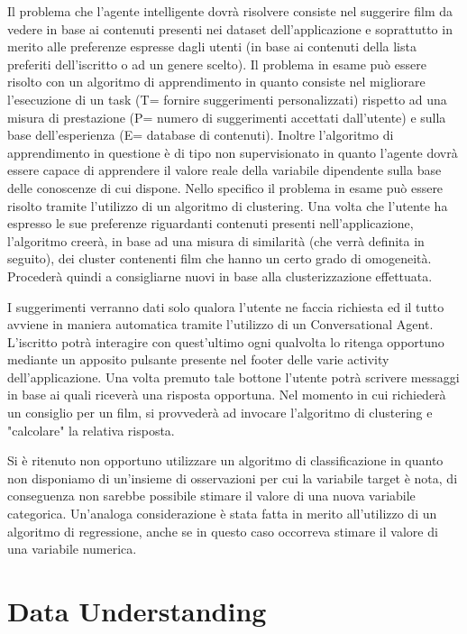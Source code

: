 \documentclass[a4paper, 10pt]{report}
\begin{document}
    Il problema che l'agente intelligente dovrà risolvere consiste nel suggerire film da vedere in base ai contenuti
    presenti nei dataset dell'applicazione e soprattutto in merito alle preferenze espresse dagli utenti (in base ai
    contenuti della lista preferiti dell'iscritto o ad un genere scelto).
    Il problema in esame può essere risolto con un algoritmo di apprendimento in quanto consiste nel migliorare l'esecuzione
    di un task (T= fornire suggerimenti personalizzati) rispetto ad una misura di prestazione (P= numero di suggerimenti accettati
    dall'utente) e sulla base dell'esperienza (E= database di contenuti). Inoltre l'algoritmo di apprendimento
    in questione è di tipo non supervisionato in quanto l'agente dovrà essere capace di apprendere il valore reale della
    variabile dipendente sulla base delle conoscenze di cui dispone.
    Nello specifico il problema in esame può essere risolto tramite l'utilizzo di un algoritmo di clustering. Una volta che l'utente
    ha espresso le sue preferenze riguardanti contenuti presenti nell'applicazione, l'algoritmo creerà, in base ad una misura di similarità
    (che verrà definita in seguito), dei cluster contenenti film che hanno un certo grado di omogeneità. Procederà quindi a consigliarne nuovi
    in base alla clusterizzazione effettuata.


    I suggerimenti verranno dati solo qualora l'utente ne faccia richiesta ed il tutto avviene in maniera automatica tramite l'utilizzo
    di un Conversational Agent. L'iscritto potrà interagire con quest'ultimo ogni qualvolta lo ritenga opportuno mediante un apposito
    pulsante presente nel footer delle varie activity dell'applicazione. Una volta premuto tale bottone l'utente potrà scrivere messaggi
    in base ai quali riceverà una risposta opportuna. Nel momento in cui richiederà un consiglio per un film, si provvederà ad invocare
    l'algoritmo di clustering e "calcolare" la relativa risposta.

    Si è ritenuto non opportuno utilizzare un algoritmo di classificazione in quanto non disponiamo di un'insieme di osservazioni per cui
    la variabile target è nota, di conseguenza non sarebbe possibile stimare il valore di una nuova variabile categorica.
    Un'analoga considerazione è stata fatta in merito all'utilizzo di un algoritmo di regressione, anche se in questo caso occorreva
    stimare il valore di una variabile numerica.

    \chapter{Data Understanding}\label{ch:data-understanding}
\end{document}
